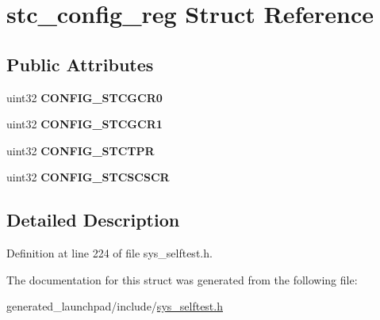 \hypertarget{structstc__config__reg}{}\section{stc\+\_\+config\+\_\+reg Struct Reference}
\label{structstc__config__reg}
\subsection*{Public Attributes}
\begin{DoxyCompactItemize}
\item 
\mbox{\label{structstc__config__reg_a122fab2dbd24e0ee8bdd7278d80d1018}} 
uint32 {\bfseries C\+O\+N\+F\+I\+G\+\_\+\+S\+T\+C\+G\+C\+R0}
\item 
\mbox{\label{structstc__config__reg_a999e4b2422c7770335a8b1c27c86d69b}} 
uint32 {\bfseries C\+O\+N\+F\+I\+G\+\_\+\+S\+T\+C\+G\+C\+R1}
\item 
\mbox{\label{structstc__config__reg_a7ae3ca2812ece8722335cd1fecb217ad}} 
uint32 {\bfseries C\+O\+N\+F\+I\+G\+\_\+\+S\+T\+C\+T\+PR}
\item 
\mbox{\label{structstc__config__reg_a3583e8100404cb2fec883c80233b99f4}} 
uint32 {\bfseries C\+O\+N\+F\+I\+G\+\_\+\+S\+T\+C\+S\+C\+S\+CR}
\end{DoxyCompactItemize}


\subsection{Detailed Description}


Definition at line 224 of file sys\+\_\+selftest.\+h.



The documentation for this struct was generated from the following file\+:\begin{DoxyCompactItemize}
\item 
generated\+\_\+launchpad/include/\mbox{\hyperlink{sys__selftest_8h}{sys\+\_\+selftest.\+h}}\end{DoxyCompactItemize}
